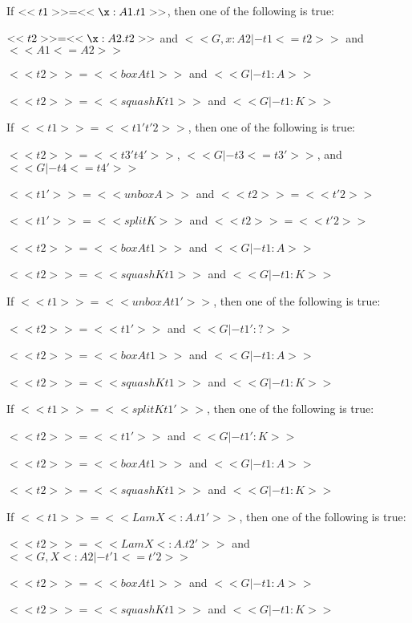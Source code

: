 \begin{lemma}
\begin{enumR}
  \item If $<<t1>> = <<\x:A1.t1>>$,
    then one of the following is true:
    \begin{enumA}
    \item $<<t2>> = <<\x:A2.t2>>$ and $<<G, x : A2 |- t1 <= t2>>$ and $<<A1 <= A2>>$      
    \item $<<t2>> = <<box A t1>>$ and $<<G |- t1 : A>>$
    \item $<<t2>> = <<squash K t1>>$ and $<<G |- t1 : K>>$
    \end{enumA}

  \item If $<<t1>> = <<t1' t'2>>$, then one of the following is true:
    \begin{enumA}
    \item $<<t2>> = <<t3' t4'>>$, $<<G |- t3 <= t3'>>$, and $<<G |- t4 <= t4'>>$
    \item $<<t1'>> = <<unbox A>>$ and $<<t2>> = <<t'2>>$
    \item $<<t1'>> = <<split K>>$ and $<<t2>> = <<t'2>>$
    \item $<<t2>> = <<box A t1>>$ and $<<G |- t1 : A>>$
    \item $<<t2>> = <<squash K t1>>$ and $<<G |- t1 : K>>$
    \end{enumA}
    
  \item If $<<t1>> = <<unbox A t1'>>$,
    then one of the following is true:
    \begin{enumA}
    \item $<<t2>> = <<t1'>>$ and $<<G |- t1' : ?>>$
    \item $<<t2>> = <<box A t1>>$ and $<<G |- t1 : A>>$
    \item $<<t2>> = <<squash K t1>>$ and $<<G |- t1 : K>>$
    \end{enumA}

  \item If $<<t1>> = <<split K t1'>>$,
    then one of the following is true:
    \begin{enumA}
    \item $<<t2>> = <<t1'>>$ and $<<G |- t1' : K>>$
    \item $<<t2>> = <<box A t1>>$ and $<<G |- t1 : A>>$
    \item $<<t2>> = <<squash K t1>>$ and $<<G |- t1 : K>>$
    \end{enumA}

  \item If $<<t1>> = <<Lam X <:A . t1'>>$,
    then one of the following is true:
    \begin{enumA}
    \item $<<t2>> = <<Lam X <: A.t2'>>$ and $<<G, X <: A2 |- t'1 <= t'2>>$
    \item $<<t2>> = <<box A t1>>$ and $<<G |- t1 : A>>$
    \item $<<t2>> = <<squash K t1>>$ and $<<G |- t1 : K>>$
    \end{enumA}


\end{enumR}
\end{lemma}
